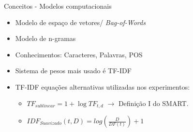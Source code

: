 \begin{frame}{Conceitos - Modelos computacionais}
\begin{tcolorbox}[title=Modelo tradicional de representação textual - BOW,valign=center]\selectFont
	\begin{itemize}
		\item Modelo de espaço de vetores/ {\it Bag-of-Words}  \cite{Turney2010}
		\item Modelo de n-gramas 
		\item Conhecimentos: Caracteres, Palavras, POS
		\item Sistema de pesos mais usado é TF-IDF
		\item TF-IDF equações alternativas utilizadas nos experimentos:
			\begin{itemize}\selectFont
				\item $ TF_{sublinear} = 1 + \log TF_{t,d}$  $\longrightarrow$ Definição I do SMART. 
				\item $
				IDF_{Suavizado}(t,D) = log\left (
				\frac{D}{DF(t)}
				\right ) + 1
				$
			\end{itemize}
	\end{itemize}	
\end{tcolorbox}
\end{frame}

